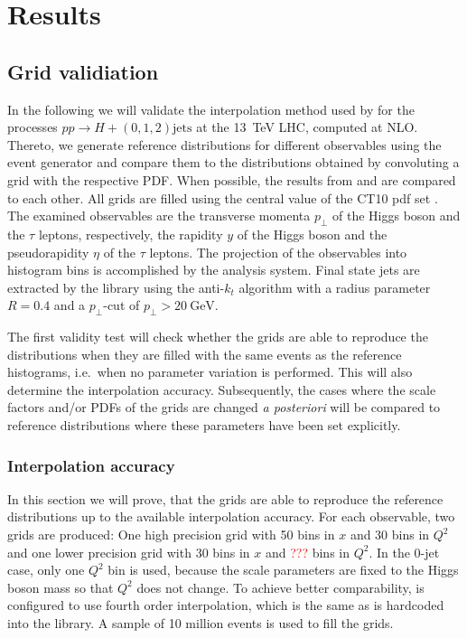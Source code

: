 
\chapter{Results}
%
\section{Grid validiation}
In the following we will validate the interpolation method used by \mcgrid{} for the processes $pp \rightarrow H + (0,1,2) \text{jets}$ at the \SI{13}{\tera\electronvolt} LHC, computed at NLO.
Thereto, we generate reference distributions for different observables using the \sherpa{} event generator and compare them to the distributions obtained by convoluting a grid with the respective PDF.
When possible, the results from \appl{} and \fnlo{} are compared to each other.
All grids are filled using the central value of the CT10 pdf set \cite{ct10}.
The examined observables are the transverse momenta $p_\perp$ of the Higgs boson and the $\tau$ leptons, respectively, the rapidity $y$ of the Higgs boson and the pseudorapidity $\eta$ of the $\tau$ leptons.
The projection of the observables into histogram bins is accomplished by the \rivet{} analysis system.
Final state jets are extracted by the \fastjet{} library \cite{fastjet_manual} using the anti-$k_t$ algorithm \cite{anti_kt} with a radius parameter $R=0.4$ and a $p_\perp$-cut of $p_\perp > \SI{20}{\giga\electronvolt}$.

The first validity test will check whether the grids are able to reproduce the distributions when they are filled with the same events as the reference histograms, i.e.\ when no parameter variation is performed.
This will also determine the interpolation accuracy.
Subsequently, the cases where the scale factors and/or PDFs of the grids are changed \textit{a posteriori} will be compared to reference distributions where these parameters have been set explicitly.
%
\subsection{Interpolation accuracy}
In this section we will prove, that the grids are able to reproduce the reference distributions up to the available interpolation accuracy.
For each observable, two grids are produced: One high precision grid with \num{50} bins in $x$ and \num{30} bins in $Q^2$ and one lower precision grid with \num{30} bins in $x$ and \textcolor{red}{???} bins in $Q^2$.
In the 0-jet case, only one $Q^2$ bin is used, because the scale parameters are fixed to the Higgs boson mass so that $Q^2$ does not change.
To achieve better comparability, \appl{} is configured to use fourth order interpolation, which is the same as is hardcoded into the \fnlo{} library.
A sample of \num{10} million events is used to fill the grids.

